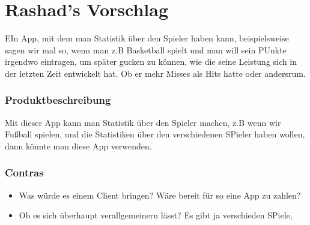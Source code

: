 \section{Rashad's Vorschlag}


EIn App, mit dem man Statistik über den Spieler haben kann, beispielsweise sagen wir mal so, wenn man z.B Basketball spielt und man will sein PUnkte irgendwo eintragen, um später gucken zu können, wie die seine Leistung sich in der letzten Zeit entwickelt hat. Ob er mehr Misses als Hits hatte oder andersrum. 


\subsubsection{Produktbeschreibung}
Mit dieser App kann man Statistik über den Spieler machen, z.B wenn wir Fußball spielen, und die Statistiken über den verschiedenen SPieler haben wollen, dann könnte man diese App verwenden. 

\vspace{0.2cm}





\subsubsection{Contras}
\begin{itemize}
\item Was würde es einem Client bringen? Wäre bereit für so eine App zu zahlen?
\item Ob es sich überhaupt verallgemeinern lässt? Es gibt ja verschieden SPiele, 

\end{itemize}